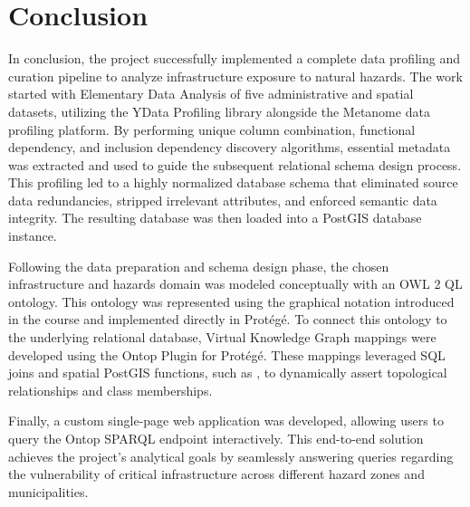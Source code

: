 
\section{Conclusion} \label{conclusion}

In conclusion, the project successfully implemented a complete data profiling and curation pipeline to analyze infrastructure exposure to natural hazards. The work started with Elementary Data Analysis of five administrative and spatial datasets, utilizing the YData Profiling library alongside the Metanome data profiling platform. By performing unique column combination, functional dependency, and inclusion dependency discovery algorithms, essential metadata was extracted and used to guide the subsequent relational schema design process. This profiling led to a highly normalized database schema that eliminated source data redundancies, stripped irrelevant attributes, and enforced semantic data integrity. The resulting database was then loaded into a PostGIS database instance.

Following the data preparation and schema design phase, the chosen infrastructure and hazards domain was modeled conceptually with an OWL 2 QL ontology. This ontology was represented using the graphical notation introduced in the course and implemented directly in Protégé. To connect this ontology to the underlying relational database, Virtual Knowledge Graph mappings were developed using the Ontop Plugin for Protégé. These mappings leveraged SQL joins and spatial PostGIS functions, such as , to dynamically assert topological relationships and class memberships.

Finally, a custom single-page web application was developed, allowing users to query the Ontop SPARQL endpoint interactively. This end-to-end solution achieves the project's analytical goals by seamlessly answering queries regarding the vulnerability of critical infrastructure across different hazard zones and municipalities.

